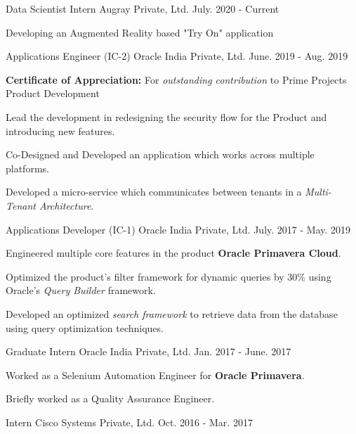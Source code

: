 \begin{cventries}
\cventry
    {Data Scientist Intern}
    {Augray Private, Ltd.}
    {}
    {July. 2020 - Current}
    {
      \begin{cvitems}
        \item {Developing an Augmented Reality based "Try On" application}
      \end{cvitems}
    }
  \cventry
    {Applications Engineer (IC-2)}
    {Oracle India Private, Ltd.}
    {}
    {June. 2019 - Aug. 2019}
    {
      \begin{cvitems}
        \item {\textbf{Certificate of Appreciation:} For \textit{outstanding contribution} to Prime Projects Product Development}
        \item {Lead the development in redesigning the security flow for the Product and introducing new features.}
        \item {Co-Designed and Developed an application which works across multiple platforms.}
        \item {Developed a micro-service which communicates between tenants in a \textit{Multi-Tenant Architecture}.}
      \end{cvitems}
    }
  \cventry
    {Applications Developer (IC-1)}
    {Oracle India Private, Ltd.}
    {}
    {July. 2017 - May. 2019}
    {
      \begin{cvitems}
        \item {Engineered multiple core features in the product \textbf{Oracle Primavera Cloud}.}
        \item {Optimized the product's filter framework for dynamic queries by 30\% using Oracle's \textit{Query Builder} framework.}
        \item {Developed an optimized \textit{search framework} to retrieve data from the database using query optimization techniques.}
      \end{cvitems}
    }
  \cventry
    {Graduate Intern}
    {Oracle India Private, Ltd.}
    {}
    {Jan. 2017 - June. 2017}
    {
      \begin{cvitems}
        \item {Worked as a Selenium Automation Engineer for \textbf{Oracle Primavera}.}
        \item {Briefly worked as a Quality Assurance Engineer.}
      \end{cvitems}
    }
  \cventry
    {Intern}
    {Cisco Systems Private, Ltd.}
    {}
    {Oct. 2016 - Mar. 2017}

\end{cventries}
